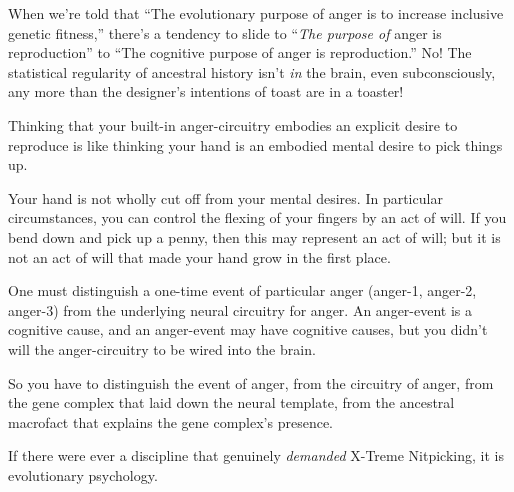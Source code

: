 {
 When we're told that ``The
evolutionary purpose of anger is to increase inclusive genetic
fitness,'' there's a tendency to
slide to ``\textit{The purpose of} anger is
reproduction'' to ``The cognitive
purpose of anger is reproduction.'' No! The
statistical regularity of ancestral history isn't
\textit{in} the brain, even subconsciously, any more than the
designer's intentions of toast are in a toaster!}

{
 Thinking that your built-in anger-circuitry embodies an explicit
desire to reproduce is like thinking your hand is an embodied mental
desire to pick things up.}

{
 Your hand is not wholly cut off from your mental desires. In
particular circumstances, you can control the flexing of your fingers
by an act of will. If you bend down and pick up a penny, then this may
represent an act of will; but it is not an act of will that made your
hand grow in the first place.}

{
 One must distinguish a one-time event of particular anger
(anger-1, anger-2, anger-3) from the underlying neural circuitry for
anger. An anger-event is a cognitive cause, and an anger-event may have
cognitive causes, but you didn't will the
anger-circuitry to be wired into the brain.}

{
 So you have to distinguish the event of anger, from the circuitry
of anger, from the gene complex that laid down the neural template,
from the ancestral macrofact that explains the gene
complex's presence.}

{
 If there were ever a discipline that genuinely \textit{demanded}
X-Treme Nitpicking, it is evolutionary psychology.}

